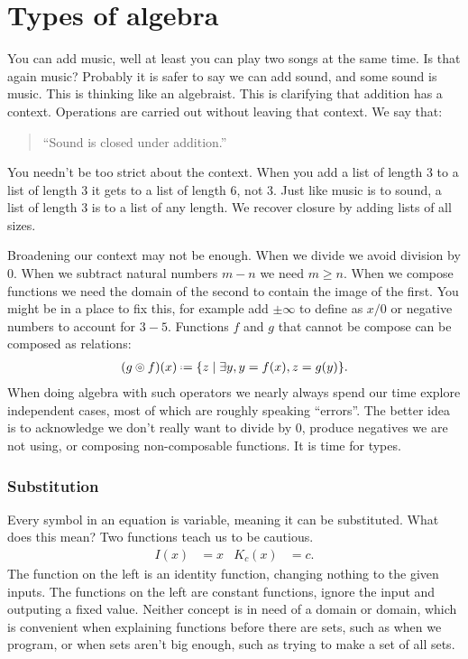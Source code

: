 \chapter{Types of algebra}

You can add music, well at least you can play two songs at the same time.
Is that again music?  Probably it is safer to say we can add sound, and 
some sound is music.  This is thinking like an algebraist.  This is 
clarifying that addition has a context.  Operations are carried out 
without leaving that context.  We say that:
\begin{quote}
    ``Sound is closed under addition.''
\end{quote}
You needn't be too strict about the context.
When you add a list of length 3 to a 
list of length 3 it gets to a list of length 6, not 3.
Just like music is to sound, a list of length 3 is to a list of any length.
We recover closure by adding lists of all sizes.

Broadening our context may not be enough.  When we divide 
we avoid division by $0$.  When we subtract natural numbers $m-n$
we need $m\geq n$.  When we compose functions we need the 
domain of the second to contain the image of the first.
You might be in a place to fix this, for example add $\pm\infty$ 
to define as $x/0$ or negative numbers to account for $3-5$.
Functions $f$ and $g$ that cannot be compose can be composed as relations:
\begin{align*}
    (g\circledcirc f)(x) \defeq \{z\mid \exists y, y=f(x), z=g(y)\}.
\end{align*}
When doing algebra with such operators we nearly always spend 
our time explore independent cases, most of which are 
roughly speaking ``errors''.  The better idea is to acknowledge 
we don't really want to divide by 0, produce negatives we are not using,
or composing non-composable functions.  It is time for types.

\subsection{Substitution}
Every symbol in an equation is variable, meaning it can be substituted.
What does this mean?  Two functions teach us to be cautious.
\begin{align*}
    I(x) & = x & 
    K_c(x) & = c.
\end{align*}
The function on the left is an identity function, changing nothing 
to the given inputs.  The functions on the left are constant functions, 
ignore the input and outputing a fixed value.  Neither concept 
is in need of a domain or domain, which is convenient when explaining 
functions before there are sets, such as when we program, or when sets 
aren't big enough, such as trying to make a set of all sets.

